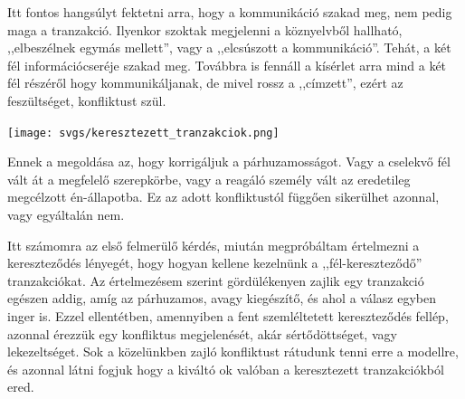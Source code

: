 \documentclass[a4paper,12pt]{article}
\begin{document}
	Itt fontos hangsúlyt fektetni arra, hogy a kommunikáció szakad meg, nem pedig maga a tranzakció. Ilyenkor szoktak megjelenni a köznyelvből hallható, ,,elbeszélnek egymás mellett'', vagy a ,,elcsúszott a kommunikáció''. Tehát, a két fél információcseréje szakad meg. Továbbra is fennáll a kísérlet arra mind a két fél részéről hogy kommunikáljanak, de mivel rossz a ,,címzett'', ezért az feszültséget, konfliktust szül.
	
	\begin{center}
		\texttt{[image: svgs/keresztezett\_tranzakciok.png]} \\[0.5cm]
	\end{center}
	Ennek a megoldása az, hogy korrigáljuk a párhuzamosságot. Vagy a cselekvő fél vált át a megfelelő szerepkörbe, vagy a reagáló személy vált az eredetileg megcélzott én-állapotba. Ez az adott konfliktustól függően sikerülhet azonnal, vagy egyáltalán nem.
	
	Itt számomra az első felmerülő kérdés, miután megpróbáltam értelmezni a kereszteződés lényegét, hogy hogyan kellene kezelnünk a ,,fél-kereszteződő'' tranzakciókat. Az értelmezésem szerint gördülékenyen zajlik egy tranzakció egészen addig, amíg az párhuzamos, avagy kiegészítő, és ahol a válasz egyben inger is. 
	Ezzel ellentétben, amennyiben a fent szemléltetett kereszteződés fellép, azonnal érezzük egy konfliktus megjelenését, akár sértődöttséget, vagy lekezeltséget. Sok a közelünkben zajló konfliktust rátudunk tenni erre a modellre, és azonnal látni fogjuk hogy a kiváltó ok valóban a keresztezett tranzakciókból ered. 
	
\end{document}
